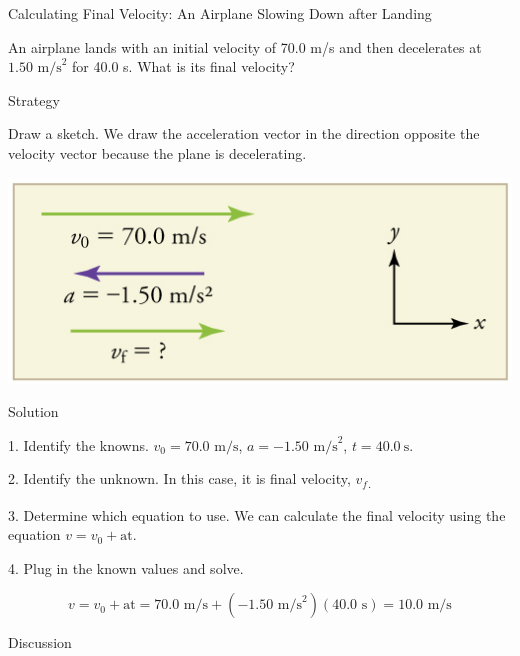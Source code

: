 \documentclass[
]{book}
\newenvironment{tinysection}{}{}
\begin{document}
\hypertarget{fs-id1164906431414}{}
Calculating Final Velocity: An Airplane Slowing Down after Landing

An airplane lands with an initial velocity of 70.0 m/s and then
decelerates at \({1\text{.}\text{50\ m/s}^{2}}{}\) for 40.0 s. What is its
final velocity?

\begin{tinysection}

{Strategy}

\end{tinysection}

Draw a sketch. We draw the acceleration vector in the direction opposite
the velocity vector because the plane is decelerating.

\includegraphics{images/Figure_02_05_00c.jpg}

\begin{tinysection}

{Solution}

\end{tinysection}

1. Identify the knowns. \({{v_{0} = \text{70}}\text{.}\text{0\ m/s}}{}\),
\({{a = {- 1}}\text{.}\text{50\ m/s}^{2}}{}\),
\({{t = \text{40}}\text{.}0\ \text{s}}{}\).

2. Identify the unknown. In this case, it is final velocity,
\(v_{f}{}\)\textsubscript{.}

3. Determine which equation to use. We can calculate the final velocity
using the equation \({v = {v_{0} + \text{at}}}{}\).

4. Plug in the known values and solve.

\leavevmode\hypertarget{import-auto-id2177855}{}%
\[{{{v = {v_{0} + \text{at}}} = \text{70}}\text{.}{\text{0\ m/s} + \left( {{- 1}\text{.}\text{50\ m/s}^{2}} \right)}{\left( {\text{40}\text{.}\text{0\ s}} \right) = \text{10}}\text{.}\text{0\ m/s}}{}\]

\begin{tinysection}

{Discussion}

\end{tinysection}
\end{document}
